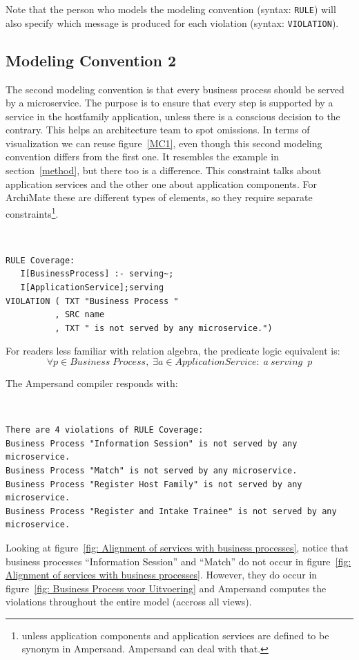 \documentclass[sn-vancouver]{sn-jnl}%
\theoremstyle{thmstyleone}%
\theoremstyle{thmstyletwo}%
\theoremstyle{thmstylethree}%
\begin{document}
Note that the person who models the modeling convention (syntax: \verb#RULE#) will also specify which message is produced for each violation (syntax: \verb#VIOLATION#).

\subsection{Modeling Convention 2}
The second modeling convention is that every business process should be served by a microservice.
The purpose is to ensure that every step is supported by a service in the hostfamily application, unless there is a conscious decision to the contrary.
This helps an architecture team to spot omissions.
In terms of visualization we can reuse figure~\ref{MC1}, even though this second modeling convention differs from the first one.
It resembles the example in section~\ref{method}, but there too is a difference.
This constraint talks about application services and the other one about application components.
For ArchiMate these are different types of elements, so they require separate constraints\footnote{unless application components and application services are defined to be synonym in Ampersand. Ampersand can deal with that.}.

{\tt\small
\begin{lstlisting}[frame=single, label={mc2}, caption={}]
RULE Coverage:
   I[BusinessProcess] :- serving~;
   I[ApplicationService];serving
VIOLATION ( TXT "Business Process "
          , SRC name
          , TXT " is not served by any microservice.")
\end{lstlisting}
}
For readers less familiar with relation algebra, the predicate logic equivalent is:
\[\forall p \in Business\;Process, \;\exists a\in Application Service: \;a\ serving\ \; p\]

The Ampersand compiler responds with:

{\tt\small
\begin{lstlisting}[frame=single, label={mc2result}, caption={}]
There are 4 violations of RULE Coverage:
Business Process "Information Session" is not served by any microservice.
Business Process "Match" is not served by any microservice.
Business Process "Register Host Family" is not served by any microservice.
Business Process "Register and Intake Trainee" is not served by any  microservice.
\end{lstlisting}
}

Looking at figure~\ref{fig: Alignment of services with business processes},
notice that business processes ``Information Session'' and ``Match'' do not occur in figure~\ref{fig: Alignment of services with business processes}.
However, they do occur in figure~\ref{fig: Business Process voor Uitvoering} and Ampersand computes the violations throughout the entire model (accross all views).
\end{document}

